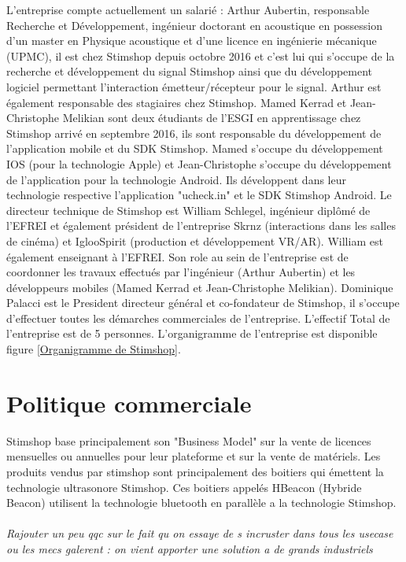 \documentclass[12pt]{report}
\begin{document}
L'entreprise compte actuellement un salarié : Arthur Aubertin, responsable Recherche et Développement, ingénieur doctorant en acoustique en possession d'un master en Physique acoustique et d'une licence en ingénierie mécanique (UPMC), il est chez Stimshop depuis octobre 2016 et c'est lui qui s'occupe de la recherche et développement du signal Stimshop ainsi que du développement logiciel permettant l'interaction émetteur/récepteur pour le signal. Arthur est également responsable des stagiaires chez Stimshop. Mamed Kerrad et Jean-Christophe Melikian sont deux étudiants de l'ESGI en apprentissage chez Stimshop arrivé en septembre 2016, ils sont responsable du développement de l'application mobile et du SDK Stimshop. Mamed s'occupe du développement IOS (pour la technologie Apple) et Jean-Christophe s'occupe du développement de l'application pour la technologie Android. Ils développent dans leur technologie respective l'application "ucheck.in" et le SDK Stimshop Android. Le directeur technique de Stimshop est William Schlegel, ingénieur diplômé de l'EFREI et également président de l'entreprise Skrnz (interactions dans les salles de cinéma) et IglooSpirit (production et développement VR/AR). William est également enseignant à l'EFREI. Son role au sein de l'entreprise est de coordonner les travaux effectués par l'ingénieur (Arthur Aubertin) et les développeurs mobiles (Mamed Kerrad et Jean-Christophe Melikian). Dominique Palacci est le President directeur général et co-fondateur de Stimshop, il s'occupe d'effectuer toutes les démarches commerciales de l'entreprise. L'effectif Total de l'entreprise est de 5 personnes. L'organigramme de l'entreprise est disponible figure \ref{Organigramme de Stimshop}.

	\section{Politique commerciale}

Stimshop base principalement son "Business Model" sur la vente de licences mensuelles ou annuelles pour leur plateforme et sur la vente de matériels. Les produits vendus par stimshop sont principalement des boitiers qui émettent la technologie ultrasonore Stimshop. Ces boitiers appelés HBeacon (Hybride Beacon) utilisent la technologie bluetooth en parallèle a la technologie Stimshop.

\paragraph{}
\textit{Rajouter un peu qqc sur le fait qu on essaye de s incruster dans tous les usecase ou les mecs galerent : on vient apporter une solution a de grands industriels}
\end{document}
